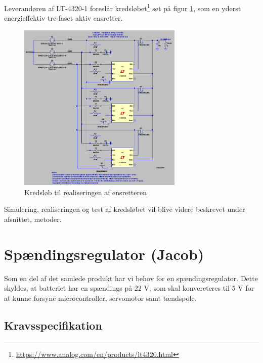 Leverandøren af LT-4320-1 foreslår kredsløbet\footnote{\url{https://www.analog.com/en/products/lt4320.html}} set på figur \ref{fig:prens2}, som en yderst energieffektiv tre-faset aktiv ensretter.

\begin{figure}[h]
  \centering
  \includegraphics[width=0.7\textwidth]{./figurer/prens4.png}
  \caption{Kredsløb til realiseringen af ensretteren}
  \label{fig:prens2}
\end{figure}

Simulering, realiseringen og test af kredsløbet vil blive videre beskrevet under afsnittet, metoder.
\clearpage

\section{Spændingsregulator (Jacob)}
\label{sec:spandingsforstarker}

Som en del af det samlede produkt har vi behov for en spændingsregulator. Dette skyldes, at batteriet har en spændings på 22 V, som skal konvereteres til 5 V for at kunne forsyne microcontroller, servomotor samt tændspole. %

\subsection{Kravsspecifikation}
\label{sec:kravsspecifikation-2}

